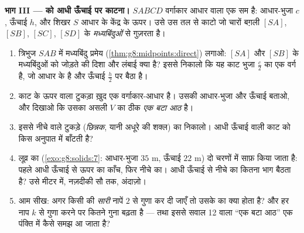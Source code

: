 \begin{problem}
\medskip
\noindent\textbf{भाग III ---  को आधी ऊँचाई पर काटना।}
$SABCD$ वर्गाकार आधार वाला एक सम  है: आधार-भुजा $c$, ऊँचाई
$h$, और शिखर $S$ आधार के केंद्र के ऊपर। उसे उस तल से काटो जो चारों
बग़ली  $[SA]$, $[SB]$, $[SC]$, $[SD]$ के \emph{मध्यबिंदुओं}
से गुज़रता है।
\begin{enumerate}[resume]
  \item त्रिभुज $SAB$ में मध्यबिंदु प्रमेय
        (\cref{thm:g8:midpoints:direct}) लगाओ: $[SA]$ और $[SB]$ के
        मध्यबिंदुओं को जोड़ते  की दिशा और लंबाई क्या है?
        इससे निकालो कि यह काट भुजा $\frac{c}{2}$ का एक वर्ग है, जो
        आधार के  है और ऊँचाई $\frac{h}{2}$ पर बैठा है।
  \item काट के ऊपर वाला टुकड़ा ख़ुद एक वर्गाकार-आधार  है।
        उसकी आधार-भुजा और ऊँचाई बताओ, और दिखाओ कि उसका  असली
         $V$ का ठीक \emph{एक बटा आठ} है।
  \item इससे नीचे वाले टुकड़े (\emph{छिन्नक}, यानी अधूरे  की
        शक्ल) का  निकालो। आधी ऊँचाई वाली काट  को किस
        अनुपात में बाँटती है?
  \item लूव्र का  (\cref{exo:g8:solids:7}: आधार-भुजा
        $35$ m, ऊँचाई $22$ m) दो चरणों में साफ़ किया जाता है: पहले
        आधी ऊँचाई से ऊपर का काँच, फिर नीचे का। आधी ऊँचाई से नीचे
        \emph{} का कितना भाग बैठता है? उसे  मीटर में, नज़दीकी
        सौ तक, अंदाज़ो।
  \item आम सीख: अगर किसी  की \emph{सारी} नापें $2$ से गुणा
        कर दी जाएँ तो उसके  का क्या होता है? और हर नाप $k$ से
        गुणा करने पर  कितने गुना बढ़ता है --- तथा इससे सवाल 12
        वाला ``एक बटा आठ'' एक पंक्ति में कैसे समझ आ जाता है?
\end{enumerate}
\end{problem}
